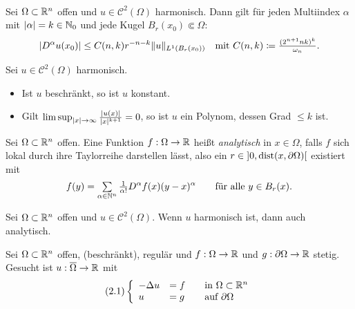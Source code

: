 \documentclass{cheat-sheet}
\newcommand{\dist}{\mathrm{dist}} %
\begin{document}
\begin{satz}\mbox{}\\
  Sei $\Omega \subset \mathbb{R}^n$ offen und $u \in \mathcal{C}^2(\Omega)$ harmonisch. Dann gilt für jeden Multiindex $\alpha$ mit $\lvert\alpha\rvert = k \in \mathbb{N}_0$ und jede Kugel $B_r(x_0) \Subset \Omega$:
  \[
    \lvert D^\alpha u(x_0)\rvert \leq C(n, k) r^{-n-k} \lVert u\rVert_{L^1(B_r(x_0))}
    \quad \text{mit } C(n, k) \coloneqq \tfrac{(2^{n+1} nk)^k}{\omega_n}.
  \]
\end{satz}

\begin{satz}[Liouville]
  Sei $u \in \mathcal{C}^2(\Omega)$ harmonisch.
  \begin{itemize}
    \item Ist $u$ beschränkt, so ist $u$ konstant.
    \item Gilt $\limsup_{\lvert x\rvert \to \infty} \tfrac{\lvert u(x)\rvert}{\lvert x\rvert^{k+1}} = 0$, so ist $u$ ein Polynom, dessen Grad $\leq k$ ist.
  \end{itemize}
\end{satz}

\begin{defn}
  Sei $\Omega \subset \mathbb{R}^n$ offen. Eine Funktion $f : \Omega \to \mathbb{R}$ heißt \emph{analytisch} in $x \in \Omega$, falls $f$ sich lokal durch ihre Taylorreihe darstellen lässt, also ein $r \in \ointerval{0}{\dist(x, \partial \Omega)}$ existiert mit
  \[
    f(y) = \sum_{\alpha \in \N^n} \tfrac{1}{\alpha!} D^\alpha f(x) (y-x)^\alpha
    \qquad \text{für alle $y \in B_r(x)$.}
  \]
\end{defn}

\begin{satz}
  Sei $\Omega \subset \mathbb{R}^n$ offen und $u \in \mathcal{C}^2(\Omega)$. Wenn $u$ harmonisch ist, dann auch analytisch.
\end{satz}


\begin{prob}
  Sei $\Omega \subset \mathbb{R}^n$ offen, (beschränkt), regulär und $f : \Omega \to \mathbb{R}$ und $g : \partial \Omega \to \mathbb{R}$ stetig. Gesucht ist $u : \overline{\Omega} \to \mathbb{R}$ mit
  \[
    (2.1) \left\{ \begin{array}{lll}
      - \Delta u &= f &\quad \text{in $\Omega \subset \mathbb{R}^n$}\\
      u &= g &\quad \text{auf $\partial \Omega$}
    \end{array} \right.
  \]
\end{prob}
\end{document}
